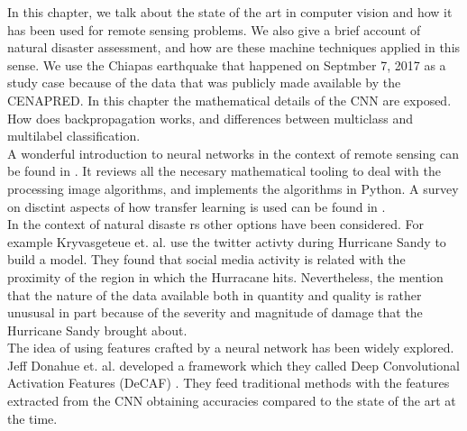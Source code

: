 In this chapter, we talk about the state of the art in computer vision and how it has been used for remote sensing problems. We also give a brief account of natural disaster assessment, and how are these machine techniques applied in this sense. We use the Chiapas earthquake that happened on Septmber 7, 2017 as a study case because of the data that was publicly made available by the CENAPRED. In this chapter the mathematical details of the CNN are exposed. How does backpropagation works, and differences between multiclass and multilabel classification.\\



A wonderful introduction to neural networks in the context of remote sensing can be found in \cite{canty2014image}. It reviews all the necesary mathematical tooling to deal with the processing image algorithms, and implements the algorithms in Python. A survey on disctint aspects of how transfer learning is used can be found in \cite{5288526}.\\

In the context of natural disaste rs other options have been considered. For example Kryvasgeteue et. al. use the twitter activty during  Hurricane Sandy to build a model. They found that social media activity is related with the proximity of the region in which the Hurracane hits\cite{Kryvasheyeue1500779}. Nevertheless, the mention that the nature of the data available both in quantity and quality is rather unususal in part because of the severity and magnitude of damage that the Hurricane Sandy brought about.\\

The idea of using features crafted by a neural network has been widely explored. Jeff Donahue et. al. developed a framework which they called Deep Convolutional Activation Features (DeCAF) \cite{DBLP:journals/corr/DonahueJVHZTD13}. They feed traditional methods with the features extracted from the CNN obtaining accuracies compared to the state of the art at the time.\\

